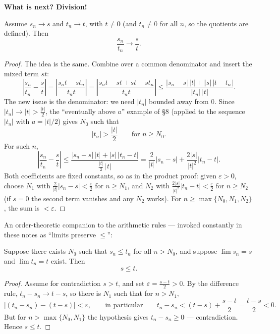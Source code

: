 \documentclass[11pt]{report}
\begin{document}
\textbf{What is next? Division!}

\begin{thmbox}[Quotients]
Assume $s_n \to s$ and $t_n \to t$, with $t \neq 0$ (and $t_n \neq 0$ for all $n$, so the quotients are defined). Then
\[
\frac{s_n}{t_n} \longrightarrow \frac{s}{t}.
\]
\end{thmbox}

\begin{proof}
The idea is the same. Combine over a common denominator and insert the mixed term $st$:
\[
\left| \frac{s_n}{t_n} - \frac{s}{t} \right|
= \left| \frac{s_n t - s t_n}{t_n t} \right|
= \left| \frac{s_n t - st + st - s t_n}{t_n t} \right|
\leq \frac{|s_n - s|\,|t| + |s|\,|t - t_n|}{|t_n|\,|t|}.
\]
The new issue is the denominator: we need $|t_n|$ bounded away from $0$. Since $|t_n| \to |t| > \tfrac{|t|}{2}$, the ``eventually above $a$'' example of \S 8 (applied to the sequence $|t_n|$ with $a = |t|/2$) gives $N_0$ such that
\[
|t_n| > \frac{|t|}{2} \qquad \text{for } n \geq N_0.
\]
For such $n$,
\[
\left| \frac{s_n}{t_n} - \frac{s}{t} \right|
\leq \frac{|s_n - s|\,|t| + |s|\,|t_n - t|}{\tfrac{|t|}{2}\,|t|}
= \frac{2}{|t|} |s_n - s| + \frac{2|s|}{|t|^2} |t_n - t|.
\]
Both coefficients are fixed constants, so as in the product proof: given $\varepsilon > 0$, choose $N_1$ with $\tfrac{2}{|t|}|s_n - s| < \tfrac\varepsilon2$ for $n \geq N_1$, and $N_2$ with $\tfrac{2|s|}{|t|^2}|t_n - t| < \tfrac\varepsilon2$ for $n \geq N_2$ (if $s = 0$ the second term vanishes and any $N_2$ works). For $n \geq \max\{N_0, N_1, N_2\}$, the sum is $< \varepsilon$.
\end{proof}

An order-theoretic companion to the arithmetic rules --- invoked constantly in these notes as ``limits preserve $\leq$'':

\begin{propbox}
Suppose there exists $N_0$ such that $s_n \leq t_n$ for all $n > N_0$, and suppose $\lim s_n = s$ and $\lim t_n = t$ exist. Then
\[
s \leq t.
\]
\end{propbox}

\begin{proof}
Assume for contradiction $s > t$, and set $\varepsilon = \tfrac{s-t}{2} > 0$. By the difference rule, $t_n - s_n \to t - s$, so there is $N_1$ such that for $n > N_1$,
\[
|(t_n - s_n) - (t - s)| < \varepsilon, \qquad \text{in particular} \qquad t_n - s_n < (t - s) + \frac{s-t}{2} = \frac{t-s}{2} < 0.
\]
But for $n > \max\{N_0, N_1\}$ the hypothesis gives $t_n - s_n \geq 0$ --- contradiction. Hence $s \leq t$.
\end{proof}
\end{document}
